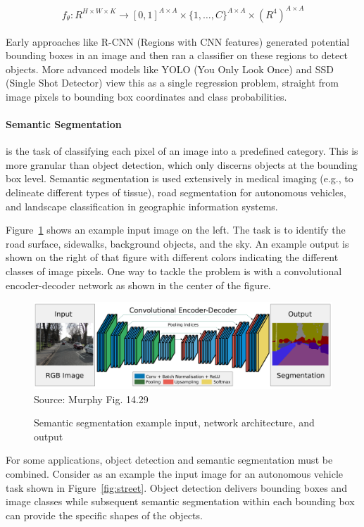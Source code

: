 \begin{align*}
f_\theta: R^{H\times W \times K} \rightarrow [0,1]^{A \times A} \times \{1, \ldots, C\}^{A \times A} \times (R^4)^{A \times A}
\end{align*}


Early approaches like R-CNN (Regions with CNN features) generated potential bounding boxes in an image and then ran a classifier on these regions to detect objects. More advanced models like YOLO (You Only Look Once) and SSD (Single Shot Detector) view this as a single regression problem, straight from image pixels to bounding box coordinates and class probabilities.

\paragraph*{Semantic Segmentation} is the task of classifying each pixel of an image into a predefined category. This is more granular than object detection, which only discerns objects at the bounding box level. Semantic segmentation is used extensively in medical imaging (e.g., to delineate different types of tissue), road segmentation for autonomous vehicles, and landscape classification in geographic information systems.

Figure~\ref{fig:screen11_chap16} shows an example input image on the left. The task is to identify the road surface, sidewalks, background objects, and the sky. An example output is shown on the right of that figure with different colors indicating the different classes of image pixels. One way to tackle the problem is with a convolutional encoder-decoder network as shown in the center of the figure.

\begin{figure}
\centering
\includegraphics[width=.9\textwidth]{screen11.png} \\

\scriptsize Source: Murphy Fig. 14.29
\normalsize
\caption{Semantic segmentation example input, network architecture, and output}
\label{fig:screen11_chap16}
\end{figure}

For some applications, object detection and semantic segmentation must be combined. Consider as an example the input image for an autonomous vehicle task shown in Figure~\ref{fig:street}. Object detection delivers bounding boxes and image classes while subsequent semantic segmentation within each bounding box can provide the specific shapes of the objects.

